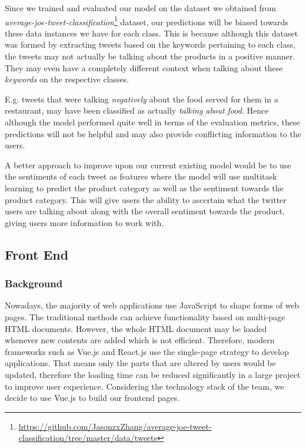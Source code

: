 \documentclass[parskip=full, 11pt]{article}
\begin{document}
Since we trained and evaluated our model on the dataset we obtained from \emph{average-joe-tweet-classification}\footnote{\url{https://github.com/JasonzxZhang/average-joe-tweet-classification/tree/master/data/tweets}} dataset, our predictions will be biased towards these data instances we have for each class. This is because although this dataset was formed by extracting tweets based on the keywords pertaining to each class, the tweets may not actually be talking about the products in a positive manner. They may even have a completely different context when talking about these \emph{keywords} on the respective classes. 

E.g. tweets that were talking \emph{negatively} about the food served for them in a restaurant, may have been classified as actually \emph{talking about food}. Hence although the model performed quite well in terms of the evaluation metrics, these predictions will not be helpful and may also provide conflicting information to the users. 

A better approach to improve upon our current existing model would be to use the sentiments of each tweet as features where the model will use multitask learning to predict the product category as well as the sentiment towards the product category. This will give users the ability to ascertain what the twitter users are talking about along with the overall sentiment towards the product, giving users more information to work with. 

\subsection{Front End}
\subsubsection{Background}
Nowadays, the majority of web applications use JavaScript to shape forms of web pages. The traditional methods can achieve functionality based on multi-page HTML documents. However, the whole HTML document may be loaded whenever new contents are added which is not efficient. Therefore, modern frameworks such as Vue.js and React.js use the single-page strategy to develop applications. That means only the parts that are altered by users would be updated, therefore the loading time can be reduced significantly in a large project to improve user experience. Considering the technology stack of the team, we decide to use Vue.js to build our frontend pages.
\end{document}
